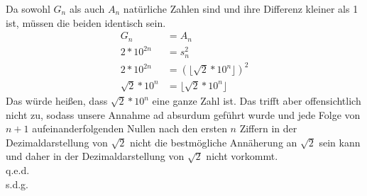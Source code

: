 \documentclass{article}
\numberwithin{equation}{section}
\begin{document}
	Da sowohl $G_n$ als auch $A_n$ natürliche Zahlen sind und ihre Differenz kleiner als 1 ist, müssen die beiden identisch sein.
	\begin{align*}
	G_n&=A_n\\
	2*10^{2n}&=s_n^2\\
	2*10^{2n}&=(\lfloor\sqrt{2}*10^n\rfloor)^2\\
	\sqrt{2}*10^n&=\lfloor\sqrt{2}*10^n\rfloor
	\end{align*}
	Das würde heißen, dass $\sqrt{2}*10^n$ eine ganze Zahl ist. Das trifft aber offensichtlich nicht zu, sodass unsere Annahme ad absurdum geführt wurde und jede Folge von $n+1$ aufeinanderfolgenden Nullen nach den ersten $n$ Ziffern in der Dezimaldarstellung von $\sqrt{2}$ nicht die bestmögliche Annäherung an $\sqrt{2}$ sein kann und daher in der Dezimaldarstellung von $\sqrt{2}$ nicht vorkommt.\\
	q.e.d.\\
	s.d.g.
\end{document}
